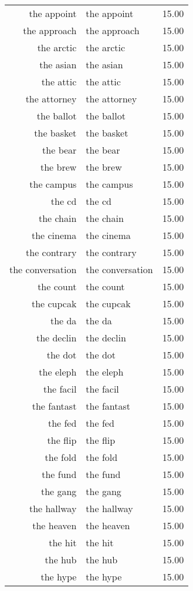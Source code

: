 \begin{table}[ht]
\begin{tabular}{rlr}
  the appoint & the appoint & 15.00 \\ 
  the approach & the approach & 15.00 \\ 
  the arctic & the arctic & 15.00 \\ 
  the asian & the asian & 15.00 \\ 
  the attic & the attic & 15.00 \\ 
  the attorney & the attorney & 15.00 \\ 
  the ballot & the ballot & 15.00 \\ 
  the basket & the basket & 15.00 \\ 
  the bear & the bear & 15.00 \\ 
  the brew & the brew & 15.00 \\ 
  the campus & the campus & 15.00 \\ 
  the cd & the cd & 15.00 \\ 
  the chain & the chain & 15.00 \\ 
  the cinema & the cinema & 15.00 \\ 
  the contrary & the contrary & 15.00 \\ 
  the conversation & the conversation & 15.00 \\ 
  the count & the count & 15.00 \\ 
  the cupcak & the cupcak & 15.00 \\ 
  the da & the da & 15.00 \\ 
  the declin & the declin & 15.00 \\ 
  the dot & the dot & 15.00 \\ 
  the eleph & the eleph & 15.00 \\ 
  the facil & the facil & 15.00 \\ 
  the fantast & the fantast & 15.00 \\ 
  the fed & the fed & 15.00 \\ 
  the flip & the flip & 15.00 \\ 
  the fold & the fold & 15.00 \\ 
  the fund & the fund & 15.00 \\ 
  the gang & the gang & 15.00 \\ 
  the hallway & the hallway & 15.00 \\ 
  the heaven & the heaven & 15.00 \\ 
  the hit & the hit & 15.00 \\ 
  the hub & the hub & 15.00 \\ 
  the hype & the hype & 15.00 \\ 

\end{tabular}
\end{table}
